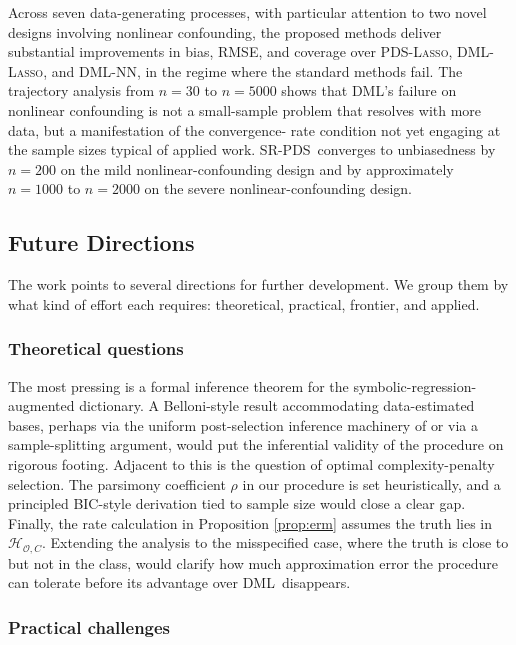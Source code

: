 \documentclass[11pt, a4paper]{article}
\theoremstyle{plain}
\theoremstyle{definition}
\theoremstyle{remark}
\newcommand{\lasso}{\textsc{Lasso}}
\newcommand{\pds}{\textsc{PDS}}
\newcommand{\dml}{\textsc{DML}}
\newcommand{\epds}{\textsc{SR-PDS}}
\newcommand{\Hcal}{\mathcal{H}_{\mathcal{O}, C}}
\begin{document}
Across seven data-generating processes, with particular
attention to two novel designs involving nonlinear confounding,
the proposed methods deliver substantial improvements in bias,
RMSE, and coverage over \pds-\lasso, \dml-\lasso, and \dml-NN,
in the regime where the standard methods fail. The trajectory
analysis from $n=30$ to $n=5000$ shows that \dml's failure on
nonlinear confounding is not a small-sample problem that
resolves with more data, but a manifestation of the convergence-%
rate condition not yet engaging at the sample sizes typical of
applied work. \epds\ converges to unbiasedness by $n=200$ on
the mild nonlinear-confounding design and by approximately
$n=1000$ to $n=2000$ on the severe nonlinear-confounding design.

\subsection{Future Directions}

The work points to several directions for further development.
We group them by what kind of effort each requires:
theoretical, practical, frontier, and applied.

\subsubsection{Theoretical questions}

The most pressing is a formal
inference theorem for the symbolic-regression-augmented
dictionary. A Belloni-style result accommodating data-estimated
bases, perhaps via the uniform post-selection inference
machinery of \citet{tibshirani2018uniform} or via a
sample-splitting argument, would put the inferential validity
of the procedure on rigorous footing. Adjacent to this is the
question of optimal complexity-penalty selection. The parsimony
coefficient $\rho$ in our procedure is set heuristically, and a
principled BIC-style derivation tied to sample size would close
a clear gap. Finally, the rate calculation in Proposition
\ref{prop:erm} assumes the truth lies in $\Hcal$. Extending the
analysis to the misspecified case, where the truth is close to
but not in the class, would clarify how much approximation
error the procedure can tolerate before its advantage over
\dml\ disappears.

\subsubsection{Practical challenges}
\end{document}
